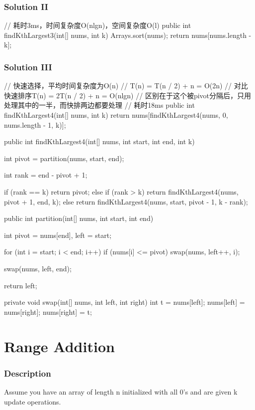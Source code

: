 \subsubsection{Solution II}
\begin{Code}
// 耗时3ms，时间复杂度O(nlgn)，空间复杂度O(l)
public int findKthLargest3(int[] nums, int k) {
    Arrays.sort(nums);
    return nums[nums.length - k];
}
\end{Code}

\newpage

\subsubsection{Solution III}
\begin{Code}
// 快速选择，平均时间复杂度为O(n)
// T(n) = T(n / 2) + n = O(2n)
// 对比快速排序T(n) = 2T(n / 2) + n = O(nlgn)
// 区别在于这个被pivot分隔后，只用处理其中的一半，而快排两边都要处理
// 耗时18ms
public int findKthLargest4(int[] nums, int k) {
    return nums[findKthLargest4(nums, 0, nums.length - 1, k)];
}

public int findKthLargest4(int[] nums, int start, int end, int k) {
    int pivot = partition(nums, start, end);

    int rank = end - pivot + 1;

    if (rank == k) {
        return pivot;
    } else if (rank > k) {
        return findKthLargest4(nums, pivot + 1, end, k);
    } else {
        return findKthLargest4(nums, start, pivot - 1, k - rank);
    }
}

public int partition(int[] nums, int start, int end) {
    int pivot = nums[end], left = start;

    for (int i = start; i < end; i++) {
        if (nums[i] <= pivot) {
            swap(nums, left++, i);
        }
    }

    swap(nums, left, end);

    return left;
}

private void swap(int[] nums, int left, int right) {
    int t = nums[left];
    nums[left] = nums[right];
    nums[right] = t;
}
\end{Code}

\newpage

\section{Range Addition} %

\subsubsection{Description}
Assume you have an array of length n initialized with all 0's and are given k update operations.

